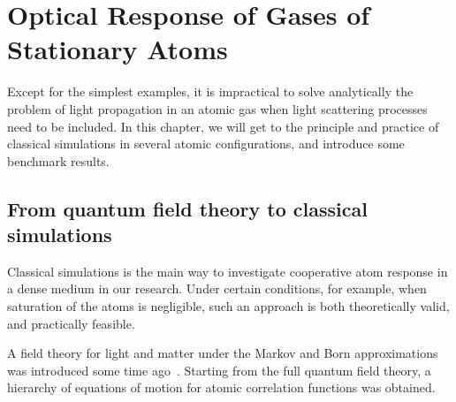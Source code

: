 \makeatletter
\newcommand{\lambdabar}{{\mathchoice
  {\smash@bar\textfont\displaystyle{0.25}{1.2}\lambda}
  {\smash@bar\textfont\textstyle{0.25}{1.2}\lambda}
  {\smash@bar\scriptfont\scriptstyle{0.25}{1.2}\lambda}
  {\smash@bar\scriptscriptfont\scriptscriptstyle{0.25}{1.2}\lambda}
}}
\newcommand{\smash@bar}[4]{%
  \smash{\rlap{\raisebox{-#3\fontdimen5#10}{$\m@th#2\mkern#4mu\mathchar'26$}}}%
}
\makeatother

\chapter{Optical Response of Gases of Stationary Atoms}

Except for the simplest examples, it is impractical to  solve analytically the problem of light propagation in an atomic gas when light scattering processes need to be included. In this chapter, we will get to  the principle and practice of classical simulations in several atomic configurations, and introduce some benchmark results.
 
\section{From quantum field theory to classical simulations}
\label{QFTTOCLASS}

Classical simulations is the main way to investigate cooperative atom response in a dense medium in our research. Under certain conditions, for example, when saturation of the atoms is negligible, such an approach is both theoretically valid, and practically feasible.

A field theory for light and matter under the Markov and Born approximations was introduced some time ago~\cite{PhysRevA.55.513}.
Starting from the full quantum field theory, a hierarchy of equations of motion for atomic correlation functions was obtained.

